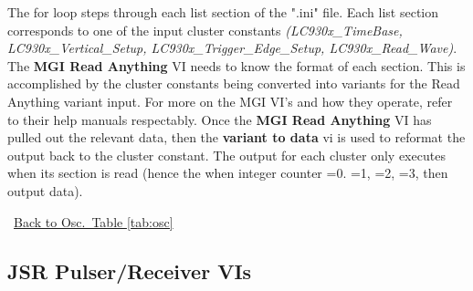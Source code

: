 \documentclass[11pt,a4paper,oldfontcommands]{memoir}
\begin{document}
The for loop steps through each list section of the ".ini" file. Each list section corresponds to one of the input cluster constants \textit{(LC930x\_TimeBase, LC930x\_Vertical\_Setup, LC930x\_Trigger\_Edge\_Setup, LC930x\_Read\_Wave)}. The \textbf{MGI Read Anything} VI needs to know the format of each section. This is accomplished by the cluster constants being converted into variants for the Read Anything variant input.  For more on the MGI VI's and how they operate, refer to their help manuals respectably. Once the \textbf{MGI Read Anything} VI has pulled out the relevant data, then the \textbf{variant to data} vi is used to reformat the output back to the cluster constant. The output for each cluster only executes when its section is read (hence the when integer counter =0. =1, =2, =3, then output data). 

\noindent\hrulefill\, \hyperref[tab:osc]{Back to Osc.\ Table \ref{tab:osc}}


\newpage

\subsection{JSR Pulser/Receiver VIs}
\end{document}
